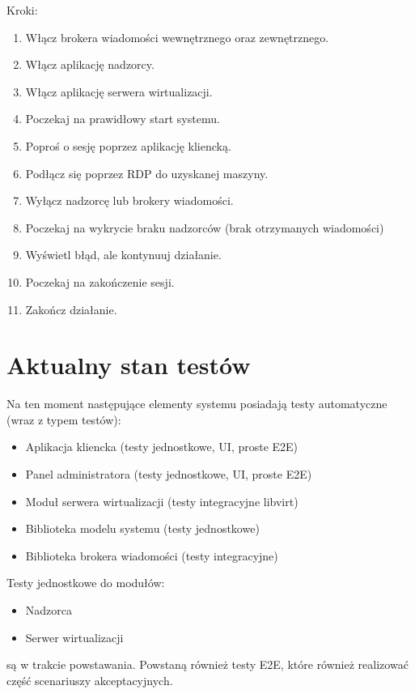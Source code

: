 \documentclass[12pt]{article}
\begin{document}
Kroki:
\begin{enumerate}
	\item Włącz brokera wiadomości wewnętrznego oraz zewnętrznego.
	\item Włącz aplikację nadzorcy.
	\item Włącz aplikację serwera wirtualizacji.
	\item Poczekaj na prawidłowy start systemu.
	\item Poproś o sesję poprzez aplikację kliencką.
	\item Podłącz się poprzez RDP do uzyskanej maszyny.
	\item Wyłącz nadzorcę lub brokery wiadomości.
	\item Poczekaj na wykrycie braku nadzorców (brak otrzymanych wiadomości)
	\item Wyświetl błąd, ale kontynuuj działanie.
	\item Poczekaj na zakończenie sesji.
	\item Zakończ działanie.
\end{enumerate}

\section{Aktualny stan testów}
Na ten moment następujące elementy systemu posiadają testy automatyczne (wraz z typem testów):
\begin{itemize}
	\item Aplikacja kliencka (testy jednostkowe, UI, proste E2E)
	\item Panel administratora (testy jednostkowe, UI, proste E2E)
	\item Moduł serwera wirtualizacji (testy integracyjne libvirt)
	\item Biblioteka modelu systemu (testy jednostkowe)
	\item Biblioteka brokera wiadomości (testy integracyjne)
\end{itemize}
Testy jednostkowe do modułów:
\begin{itemize}
	\item Nadzorca
	\item Serwer wirtualizacji
\end{itemize}
są w trakcie powstawania.
Powstaną również testy E2E, które również realizować część scenariuszy akceptacyjnych.
\end{document}
